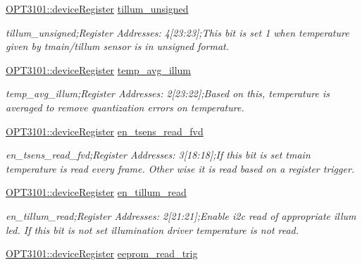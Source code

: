 \begin{DoxyCompactItemize}
\mbox{\hyperlink{class_o_p_t3101_1_1device_register}{O\+P\+T3101\+::device\+Register}} \mbox{\hyperlink{class_o_p_t3101_1_1registers_a13fb1e740a9537844a283a66981406ad}{tillum\+\_\+unsigned}}
\begin{DoxyCompactList}\small\item\em tillum\+\_\+unsigned;Register Addresses\+: 4\mbox{[}23\+:23\mbox{]};This bit is set \textquotesingle{}1\textquotesingle{} when temperature given by tmain/tillum sensor is in unsigned format. \end{DoxyCompactList}\item 
\mbox{\hyperlink{class_o_p_t3101_1_1device_register}{O\+P\+T3101\+::device\+Register}} \mbox{\hyperlink{class_o_p_t3101_1_1registers_af8a6681cc72c45378bd2d170f593e362}{temp\+\_\+avg\+\_\+illum}}
\begin{DoxyCompactList}\small\item\em temp\+\_\+avg\+\_\+illum;Register Addresses\+: 2\mbox{[}23\+:22\mbox{]};Based on this, temperature is averaged to remove quantization errors on temperature. \end{DoxyCompactList}\item 
\mbox{\hyperlink{class_o_p_t3101_1_1device_register}{O\+P\+T3101\+::device\+Register}} \mbox{\hyperlink{class_o_p_t3101_1_1registers_a791fa84b502f2801766fd8fd6429c4db}{en\+\_\+tsens\+\_\+read\+\_\+fvd}}
\begin{DoxyCompactList}\small\item\em en\+\_\+tsens\+\_\+read\+\_\+fvd;Register Addresses\+: 3\mbox{[}18\+:18\mbox{]};If this bit is set tmain temperature is read every frame. Other wise it is read based on a register trigger. \end{DoxyCompactList}\item 
\mbox{\hyperlink{class_o_p_t3101_1_1device_register}{O\+P\+T3101\+::device\+Register}} \mbox{\hyperlink{class_o_p_t3101_1_1registers_ad766b216bd75f0e6099f28f6d8ace68f}{en\+\_\+tillum\+\_\+read}}
\begin{DoxyCompactList}\small\item\em en\+\_\+tillum\+\_\+read;Register Addresses\+: 2\mbox{[}21\+:21\mbox{]};Enable i2c read of appropriate illum led. If this bit is not set illumination driver temperature is not read. \end{DoxyCompactList}\item 
\mbox{\hyperlink{class_o_p_t3101_1_1device_register}{O\+P\+T3101\+::device\+Register}} \mbox{\hyperlink{class_o_p_t3101_1_1registers_a881601f10b346c3724003a0721bd221a}{eeprom\+\_\+read\+\_\+trig}}

\end{DoxyCompactItemize}
